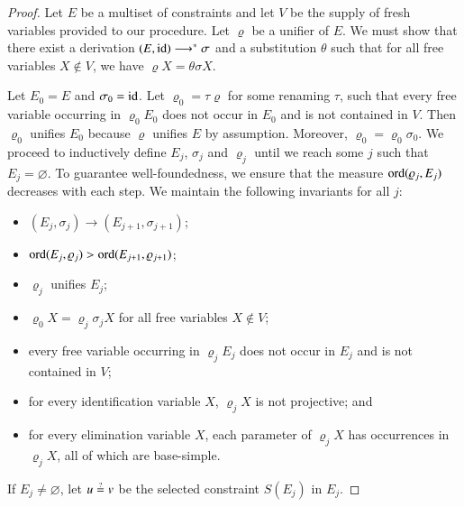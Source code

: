     \begin{proof}
    Let $E$ be a multiset of constraints
    and let $V$ be the supply of fresh variables provided to our procedure. 
    Let $\varrho$ be a unifier of $E$.
    We must show that there exist
    a derivation $(E,\operatorname{id})\longrightarrow^{*}\sigma$ and a
    substitution $\theta$ such that for all free variables $X\not\in V$, we have $\varrho X = \theta\sigma X$.
     

    Let $E_{0}=E$ and $\sigma_{0}=\operatorname{id}$. 
    Let $\varrho_{0}=\tau\varrho$ for some renaming $\tau$, such that 
    every free variable occurring in $\varrho_{0}E_{0}$ does not occur in $E_{0}$ and is not contained in $V$.
    Then $\varrho_{0}$
    unifies $E_{0}$ because $\varrho$ unifies $E$ by assumption.
    Moreover, $\varrho_{0}=\varrho_{0}\sigma_{0}$. We proceed
    to inductively define $E_{j}$, $\sigma_{j}$ and $\varrho_{j}$
    until we reach some $j$ such that $E_j = \varnothing$.
    To guarantee well-foundedness, we ensure that the measure 
    $\operatorname{ord}(\varrho_{j},E_{j})$ decreases with each step.
    We maintain the following invariants for all $j$:
    \begin{itemize}
    \item $(E_{j},\sigma_{j})\longrightarrow(E_{j+1},\sigma_{j+1})$;
    \item $\operatorname{ord}(E_{j},\varrho_{j}) > \operatorname{ord}(E_{j+1}, \varrho_{j+1})$;
    \item $\varrho_{j}$ unifies $E_{j}$;
    \item $\varrho_{0} X = \varrho_{j}\sigma_{j} X$ for all free variables $X\not\in V$;
    \item every free variable occurring in $\varrho_{j}E_{j}$ does not occur in $E_{j}$ and is not contained in $V$;
    \item for every identification variable $X$, $\varrho_j X$ is not projective; and
    \item for every elimination variable $X$, each parameter of $\varrho_j X$ 
          has occurrences in $\varrho_j X$,
          all of which are base-simple.
    \end{itemize}
    If $E_j \not= \varnothing$, let $u\unif v$ be the selected constraint $S(E_{j})$ in $E_{j}$.
    

\end{proof}
